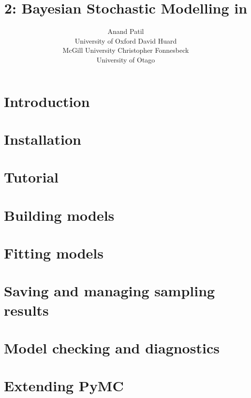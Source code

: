 \documentclass[]{jss_mod}
\author{Anand Patil\\University of Oxford \And
        David Huard\\McGill University  \And
		Christopher Fonnesbeck\\University of Otago}
\title{\pkg{PyMC} 2: Bayesian Stochastic Modelling in \proglang{Python}}
\begin{document}

\tableofcontents
\cleardoublepage
{}

\section[Introduction]{Introduction}
\label{sec:intro}


\section[Installation]{Installation}
\label{sec:install}


\section[Tutorial]{Tutorial}
\label{sec:tutorial}


\section[Building Models]{Building models}
\label{sec:modelbuilding}


\section[Fitting Models]{Fitting models}
\label{sec:modelfitting}


\section[Sampling Results]{Saving and managing sampling results}
\label{sec:database}


\section[Model Checking]{Model checking and diagnostics}
\label{sec:modelchecking}


\section[Extending PyMC]{Extending PyMC}
\label{sec:extending}

\end{document}
